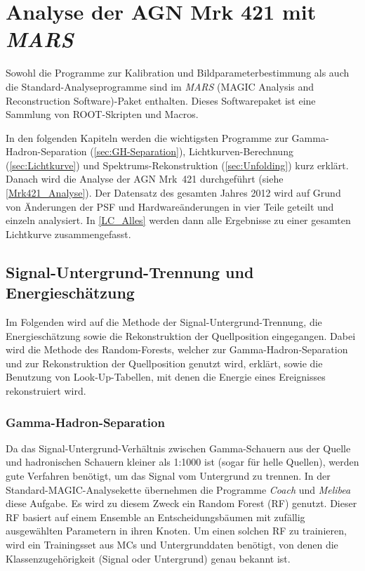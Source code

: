 \chapter{Analyse der AGN Mrk 421 mit \textit{MARS}}
\label{chapter:Analyse}
Sowohl die Programme zur Kalibration und Bildparameterbestimmung als auch die Standard-Analyseprogramme sind im \textit{MARS} (MAGIC Analysis and Reconstruction Software)-Paket enthalten.
Dieses Softwarepaket ist eine Sammlung von ROOT-Skripten und Macros.\cite{MARS}

In den folgenden Kapiteln werden die wichtigsten Programme zur Gamma-Hadron-Separation (\autoref{sec:GH-Separation}), Lichtkurven-Berechnung (\autoref{sec:Lichtkurve}) und Spektrums-Rekonstruktion (\autoref{sec:Unfolding}) kurz erklärt.
Danach wird die Analyse der AGN Mrk~421 durchgeführt (siehe \autoref{Mrk421_Analyse}).
Der Datensatz des gesamten Jahres 2012 wird auf Grund von Änderungen der PSF und Hardwareänderungen in vier Teile geteilt und einzeln analysiert. 
In \autoref{LC_Alles} werden dann alle Ergebnisse zu einer gesamten Lichtkurve zusammengefasst.


\section{Signal-Untergrund-Trennung und Energieschätzung}
\label{sec:GH-Separation}
Im Folgenden wird auf die Methode der Signal-Untergrund-Trennung, die Energieschätzung sowie die Rekonstruktion der Quellposition eingegangen.  
Dabei wird die Methode des Random-Forests, welcher zur Gamma-Hadron-Separation und zur Rekonstruktion der Quellposition genutzt wird, erklärt, sowie die Benutzung von Look-Up-Tabellen, mit denen die Energie eines Ereignisses rekonstruiert wird.


\subsection{Gamma-Hadron-Separation}
Da das Signal-Untergrund-Verhältnis zwischen Gamma-Schauern aus der Quelle und hadronischen Schauern kleiner als 1:1000 ist (sogar für helle Quellen), werden gute Verfahren benötigt, um das Signal vom Untergrund zu trennen.
In der Standard-MAGIC-Analysekette übernehmen die Programme \textit{Coach} und \textit{Melibea} diese Aufgabe. 
Es wird zu diesem Zweck ein Random Forest (RF) genutzt. \cite{RandomForestForMAGIC}
Dieser RF basiert auf einem Ensemble an Entscheidungsbäumen mit zufällig ausgewählten Parametern in ihren Knoten.
Um einen solchen RF zu trainieren, wird ein Trainingsset aus MCs und Untergrunddaten benötigt, von denen die Klassenzugehörigkeit (Signal oder Untergrund) genau bekannt ist.

